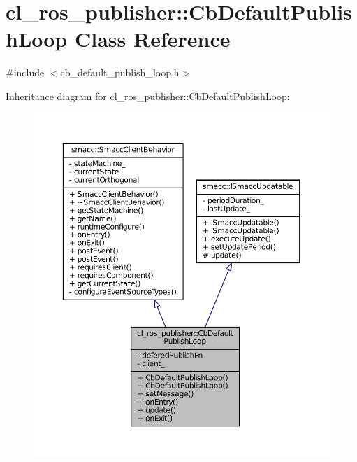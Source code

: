 \hypertarget{classcl__ros__publisher_1_1CbDefaultPublishLoop}{}\section{cl\+\_\+ros\+\_\+publisher\+:\+:Cb\+Default\+Publish\+Loop Class Reference}
\label{classcl__ros__publisher_1_1CbDefaultPublishLoop}


{\ttfamily \#include $<$cb\+\_\+default\+\_\+publish\+\_\+loop.\+h$>$}



Inheritance diagram for cl\+\_\+ros\+\_\+publisher\+:\+:Cb\+Default\+Publish\+Loop\+:
\nopagebreak
\begin{figure}[H]
\begin{center}
\leavevmode
\includegraphics[width=350pt]{classcl__ros__publisher_1_1CbDefaultPublishLoop__inherit__graph}
\end{center}
\end{figure}



